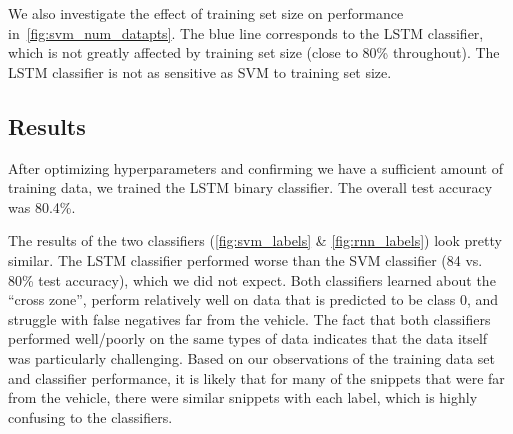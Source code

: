 We also investigate the effect of training set size on performance in~\cref{fig:svm_num_datapts}.
The blue line corresponds to the LSTM classifier, which is not greatly affected by training set size (close to 80\% throughout).
The LSTM classifier is not as sensitive as SVM to training set size. 

\subsection{Results}
After optimizing hyperparameters and confirming we have a sufficient amount of training data, we trained the LSTM binary classifier.
The overall test accuracy was 80.4\%.

The results of the two classifiers (\cref{fig:svm_labels} \& \cref{fig:rnn_labels}) look pretty similar.
The LSTM classifier performed worse than the SVM classifier (84 vs. 80\% test accuracy), which we did not expect.
Both classifiers learned about the ``cross zone'', perform relatively well on data that is predicted to be class 0, and struggle with false negatives far from the vehicle.
The fact that both classifiers performed well/poorly on the same types of data indicates that the data itself was particularly challenging.
Based on our observations of the training data set and classifier performance, it is likely that for many of the snippets that were far from the vehicle, there were similar snippets with each label, which is highly confusing to the classifiers.


